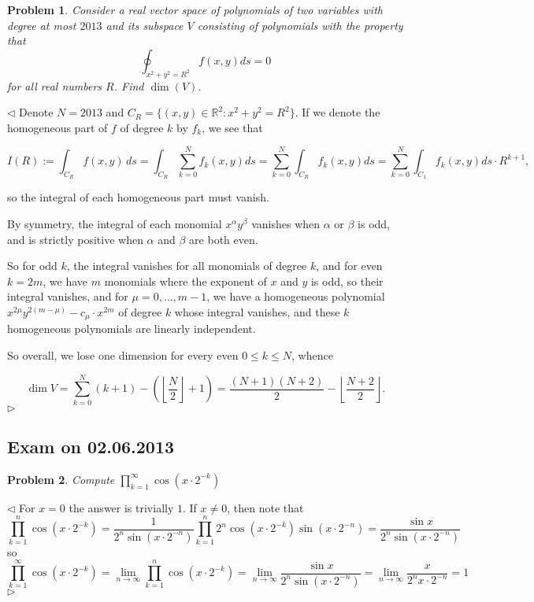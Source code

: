 \documentclass[12pt]{article}
\newtheorem{problem}{Problem}[subsection]
\newenvironment{solution}{\par $\triangleleft$}{$\triangleright$}
\begin{document}
\begin{problem} Consider a real vector space of polynomials of two variables with degree at most $2013$ and its subspace $V$ consisting of polynomials with the property that
$$
\oint_{x^2+y^2=R^2}f(x,y)ds=0
$$
 for all real numbers $R$. Find $\dim(V)$. 
\end{problem}
\begin{solution} Denote $N=2013$ and $C_R=\{(x,y)\in\mathbb{R}^2: x^2+y^2=R^2\}$. If we denote the homogeneous part of $f$ of degree $k$ by $f_k$, we see that
 
$$
I(R) 
:=\int_{C_R} f(x,y)\,ds
=\int_{C_R} \sum_{k=0}^N f_k(x,y) ds
=\sum_{k=0}^N \int_{C_R} f_k(x,y) ds
=\sum_{k=0}^N \int_{C_1}f_k(x,y) ds\cdot R^{k+1},
$$
 
so the integral of each homogeneous part must vanish.
 
By symmetry, the integral of each monomial $x^\alpha y^\beta$ vanishes when $\alpha$ or $\beta$ is odd, and is strictly positive when $\alpha$ and $\beta$ are both even.
 
So for odd $k$, the integral vanishes for all monomials of degree $k$, and for even $k = 2m$, we have $m$ monomials where the exponent of $x$ and $y$ is odd, so their integral vanishes, and for $\mu = 0,\dotsc,m-1$, we have a homogeneous polynomial $x^{2\mu}y^{2(m-\mu)} - c_\mu\cdot x^{2m}$ of degree $k$ whose integral vanishes, and these $k$ homogeneous polynomials are linearly independent.
 
So overall, we lose one dimension for every even $0 \leq k \leq N$, whence
 
$$\dim V = \sum_{k=0}^N (k+1) - \left(\left\lfloor \frac{N}{2}\right\rfloor + 1\right) = \frac{(N+1)(N+2)}{2} - \left\lfloor \frac{N+2}{2}\right\rfloor.$$
\end{solution}
 
 
 
 
 
 
 
 
 
 
 
 
 
\newpage
 
\subsection{Exam on 02.06.2013}
 
\begin{problem} Compute $\prod_{k=1}^\infty \cos(x\cdot 2^{-k})$
\end{problem}
\begin{solution} For $x=0$ the answer is trivially $1$. If $x\neq 0$, then note that
$$
\prod_{k=1}^n \cos(x\cdot 2^{-k})
=\frac{1}{2^n\sin(x\cdot 2^{-n})}\prod_{k=1}^n 2^n\cos(x\cdot 2^{-k})\sin(x\cdot 2^{-n})
=\frac{\sin x}{2^n\sin(x\cdot 2^{-n})}
$$
so
$$
\prod_{k=1}^\infty \cos(x\cdot 2^{-k})
=\lim\limits_{n\to\infty}\prod_{k=1}^n \cos(x\cdot 2^{-k})
=\lim\limits_{n\to\infty}\frac{\sin x}{2^n\sin(x\cdot 2^{-n})}
=\lim\limits_{n\to\infty}\frac{x}{2^n x\cdot 2^{-n}}=1
$$
\end{solution}
 
\end{document}

